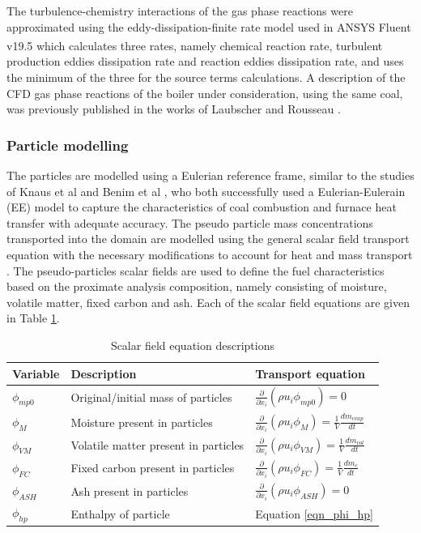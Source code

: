 \documentclass[review]{elsarticle}
\begin{document}
The turbulence-chemistry interactions of the gas phase reactions were approximated using the eddy-dissipation-finite rate model used in ANSYS Fluent v19.5\textsuperscript{\textregistered} which calculates three rates, namely chemical reaction rate, turbulent production eddies dissipation rate and reaction eddies dissipation rate, and uses the minimum of the three for the source terms calculations. A description of the CFD gas phase reactions of the boiler under consideration, using the same coal, was previously published in the works of Laubscher and Rousseau \cite{Laubscher2019b}.

\subsubsection{Particle modelling}
The particles are modelled using a Eulerian reference frame, similar to the studies of Knaus et al \cite{Knaus2001a} and Benim et al \cite{Benim2005}, who both successfully used a Eulerian-Eulerain (EE) model to capture the characteristics of coal combustion and furnace heat transfer with adequate accuracy. The pseudo particle mass concentrations transported into the domain are modelled using the general scalar field transport equation with the necessary modifications to account for heat and mass transport \cite{Versteeg2007}. The pseudo-particles scalar fields are used to define the fuel characteristics based on the proximate analysis composition, namely consisting of moisture, volatile matter, fixed  carbon and ash. Each of the scalar field equations are given in Table \ref{tab_scalars}.

\begin{table}[h!]
\centering
\caption{Scalar field equation descriptions}\label{tab_scalars}  
\vspace{2mm}     
\begin{tabular}{lll}
\hline
Variable &Description& Transport equation \\
\hline
$\phi_{mp0}$ &Original/initial mass of particles& $\frac{\partial}{\partial x_{i}}(\rho u_{i} \phi_{mp0})=0$\\
$\phi_{M}$&Moisture present in particles&$\frac{\partial}{\partial x_{i}}(\rho u_{i} \phi_{M})=\frac{1}{V} \frac{dm_{evap}}{dt}$\\
$\phi_{VM}$&Volatile matter present in particles&  $\frac{\partial}{\partial x_{i}}(\rho u_{i} \phi_{VM})=\frac{1}{V}\frac{dm_{vol}}{dt}$\\
$\phi_{FC}$&Fixed carbon present in particles&$\frac{\partial}{\partial x_{i}}(\rho u_{i} \phi_{FC})=\frac{1}{V}\frac{dm_c}{dt}$\\
$\phi_{ASH}$&Ash present in particles&$\frac{\partial}{\partial x_{i}}(\rho u_{i} \phi_{ASH})=0$\\
$\phi_{hp}$&Enthalpy of particle&Equation \eqref{eqn_phi_hp}\\
\hline
\end{tabular}
\end{table}
\end{document}
